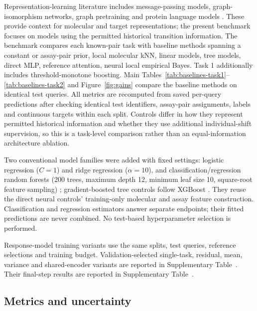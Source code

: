 \documentclass[letterpaper]{article}
\begin{document}
Representation-learning literature includes message-passing models, graph-isomorphism networks, graph pretraining and protein language models \citep{gilmer2017mpnn,xu2019gin,yang2019representations,hu2020strategies,lin2023esm2}. These provide context for molecular and target representations; the present benchmark focuses on models using the permitted historical transition information. The benchmark compares each known-pair task with baseline methods spanning a constant or assay-pair prior, local molecular kNN, linear models, tree models, direct MLP, reference attention, neural local empirical Bayes. Task 1 additionally includes threshold-monotone boosting. Main Tables~\ref{tab:baselines-task1}--\ref{tab:baselines-task2} and Figure~\ref{fig:gains} compare the baseline methods on identical test queries. All metrics are recomputed from saved per-query predictions after checking identical test identifiers, assay-pair assignments, labels and continuous targets within each split. Controls differ in how they represent permitted historical information and whether they use additional individual-shift supervision, so this is a task-level comparison rather than an equal-information architecture ablation.

Two conventional model families were added with fixed settings: logistic regression ($C=1$) and ridge regression ($\alpha=10$), and classification/regression random forests (200 trees, maximum depth 12, minimum leaf size 10, square-root feature sampling) \citep{breiman2001randomforests}; gradient-boosted tree controls follow XGBoost \citep{chen2016xgboost}. They reuse the direct neural controls' training-only molecular and assay feature construction. Classification and regression estimators answer separate endpoints; their fitted predictions are never combined. No test-based hyperparameter selection is performed.



Response-model training variants use the same splits, test queries, reference selections and training budget. Validation-selected single-task, residual, mean, variance and shared-encoder variants are reported in Supplementary Table~\SIControlledTable. Their final-step results are reported in Supplementary Table~\SIFinalTable.

\subsection{Metrics and uncertainty}
\end{document}
